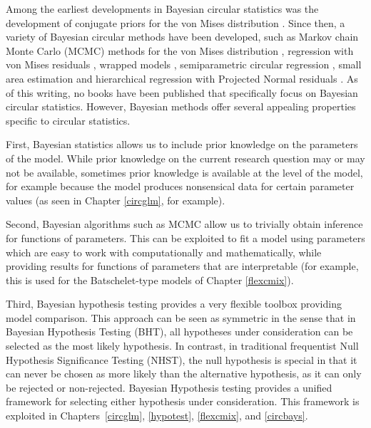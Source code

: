 \documentclass[12pt, a4paper]{book}\usepackage[]{graphicx}\usepackage[]{color}
\begin{document}
Among the earliest developments in Bayesian circular statistics was the development of conjugate priors for the von Mises distribution \citep{mardia1976bayesian}. Since then, a variety of Bayesian circular methods have been developed, such as Markov chain Monte Carlo (MCMC) methods for the von Mises distribution \citep{damien1999fullbayes, forbes2015fast}, regression with von Mises residuals \citep{gill2010}, wrapped models \citep{ravindran2011bayesian}, semiparametric circular regression \citep{george2006semiparametric, mcvinish2008semiparametric, Bhattacharya2009}, small area estimation \citep{hernandez2016hierarchical} and hierarchical regression with Projected Normal residuals \citep{nunez2011bayesian, nunez2014bayesian}. As of this writing, no books have been published that specifically focus on Bayesian circular statistics. However, Bayesian methods offer several appealing properties specific to circular statistics.

First, Bayesian statistics allows us to include prior knowledge on the parameters of the model. While prior knowledge on the current research question may or may not be available, sometimes prior knowledge is available at the level of the model, for example because the model produces nonsensical data for certain parameter values (as seen in Chapter \ref{circglm}, for example).

Second, Bayesian algorithms such as MCMC allow us to trivially obtain inference for functions of parameters. This can be exploited to fit a model using parameters which are easy to work with computationally and mathematically, while providing results for functions of parameters that are interpretable (for example, this is used for the Batschelet-type models of Chapter \ref{flexcmix}).

Third, Bayesian hypothesis testing provides a very flexible toolbox providing model comparison. This approach can be seen as symmetric in the sense that in Bayesian Hypothesis Testing (BHT), all hypotheses under consideration can be selected as the most likely hypothesis. In contrast, in traditional frequentist Null Hypothesis Significance Testing (NHST), the null hypothesis is special in that it can never be chosen as more likely than the alternative hypothesis, as it can only be rejected or non-rejected. Bayesian Hypothesis testing provides a unified framework for selecting either hypothesis under consideration. This framework is exploited in Chapters~\ref{circglm}, \ref{hypotest}, \ref{flexcmix}, and \ref{circbays}. %
\end{document}
